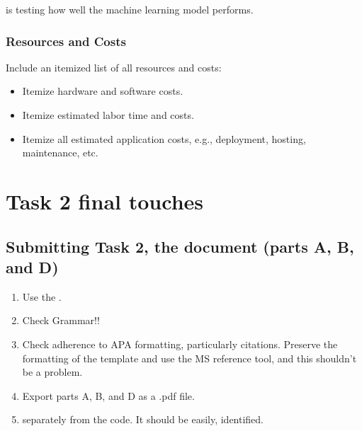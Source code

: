 \documentclass[letterpaper,10pt,english]{jupyterBook}
\begin{document}
\sphinxAtStartPar
{} is testing how well the machine learning model performs.


\subsubsection{Resources and Costs}
\label{\detokenize{task2_doc/task2_doc_a_and_b:resources-and-costs}}
\sphinxAtStartPar
Include an itemized list of all resources and costs:
\begin{itemize}
\item {} 
\sphinxAtStartPar
Itemize hardware and software costs.

\item {} 
\sphinxAtStartPar
Itemize estimated labor time and costs.

\item {} 
\sphinxAtStartPar
Itemize all estimated application costs, e.g., deployment, hosting, maintenance, etc.

\end{itemize}

\sphinxstepscope


\section{Task 2 final touches}
\label{\detokenize{task2_doc/task2_doc_finish:task-2-final-touches}}\label{\detokenize{task2_doc/task2_doc_finish::doc}}

\subsection{Submitting Task 2, the document (parts A, B, and D)}
\label{\detokenize{task2_doc/task2_doc_finish:submitting-task-2-the-document-parts-a-b-and-d}}\label{\detokenize{task2_doc/task2_doc_finish:task2-doc-finish-how-to-submit}}\begin{enumerate}
%
\item {} 
\sphinxAtStartPar
Use the .

\item {} 
\sphinxAtStartPar
Check Grammar!!

\item {} 
\sphinxAtStartPar
Check adherence to APA formatting, particularly citations. Preserve the formatting of the template and use the MS reference tool, and this shouldn’t be a problem.

\item {} 
\sphinxAtStartPar
Export parts A, B, and D as a  .pdf file.

\item {} 
\sphinxAtStartPar
{} separately from the code. It should be easily, identified.

\end{enumerate}
\end{document}
